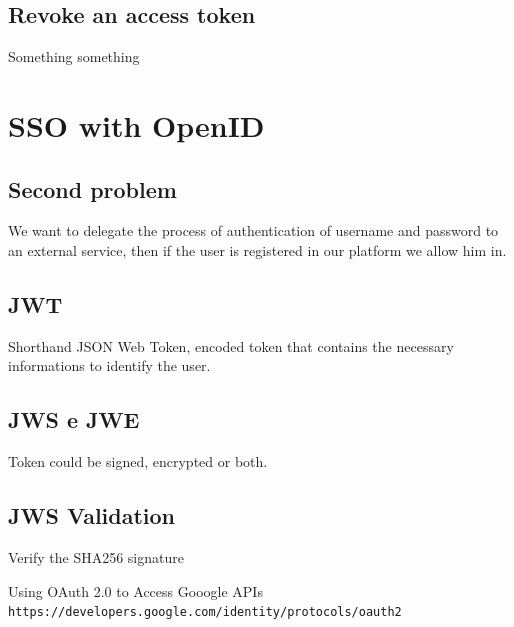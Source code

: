 \documentclass{style}
\begin{document}
\subsection{Revoke an access token}
Something something

\section{SSO with OpenID}
\subsection{Second problem}
We want to delegate the process of authentication of username and password to an external service, then if the user
is registered in our platform we allow him in.

\subsection{JWT}
Shorthand JSON Web Token, encoded token that contains the necessary informations to identify the user.
\subsection{JWS e JWE}
Token could be signed, encrypted or both.

\subsection{JWS Validation}
Verify the SHA256 signature

\begin{thebibliography}{9}
    Using OAuth 2.0 to Access Gooogle APIs
    \\\texttt{https://developers.google.com/identity/protocols/oauth2}
\end{thebibliography}

\newpage
\end{document}
